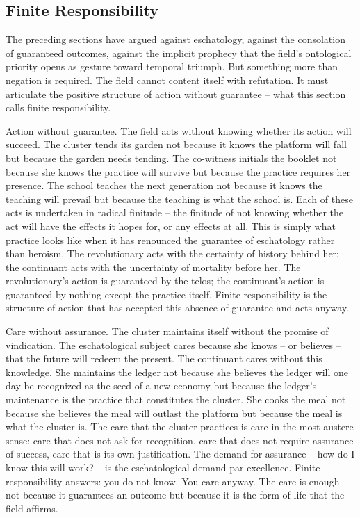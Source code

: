 \subsection{Finite Responsibility}

The preceding sections have argued against eschatology, against the consolation of guaranteed outcomes, against the implicit prophecy that the field's ontological priority opens as gesture toward temporal triumph. But something more than negation is required. The field cannot content itself with refutation. It must articulate the positive structure of action without guarantee -- what this section calls finite responsibility.

Action without guarantee. The field acts without knowing whether its action will succeed. The cluster tends its garden not because it knows the platform will fall but because the garden needs tending. The co-witness initials the booklet not because she knows the practice will survive but because the practice requires her presence. The school teaches the next generation not because it knows the teaching will prevail but because the teaching is what the school is. Each of these acts is undertaken in radical finitude -- the finitude of not knowing whether the act will have the effects it hopes for, or any effects at all. This is simply what practice looks like when it has renounced the guarantee of eschatology rather than heroism. The revolutionary acts with the certainty of history behind her; the continuant acts with the uncertainty of mortality before her. The revolutionary's action is guaranteed by the telos; the continuant's action is guaranteed by nothing except the practice itself. Finite responsibility is the structure of action that has accepted this absence of guarantee and acts anyway.

Care without assurance. The cluster maintains itself without the promise of vindication. The eschatological subject cares because she knows -- or believes -- that the future will redeem the present. The continuant cares without this knowledge. She maintains the ledger not because she believes the ledger will one day be recognized as the seed of a new economy but because the ledger's maintenance is the practice that constitutes the cluster. She cooks the meal not because she believes the meal will outlast the platform but because the meal is what the cluster is. The care that the cluster practices is care in the most austere sense: care that does not ask for recognition, care that does not require assurance of success, care that is its own justification. The demand for assurance -- how do I know this will work? -- is the eschatological demand par excellence. Finite responsibility answers: you do not know. You care anyway. The care is enough -- not because it guarantees an outcome but because it is the form of life that the field affirms.

